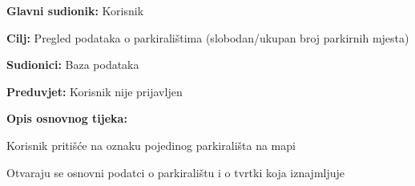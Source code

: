 \noindent {}
\begin{packed_item}
	
	\item \textbf{Glavni sudionik: } Korisnik
	\item  \textbf{Cilj:} Pregled podataka o parkiralištima (slobodan/ukupan broj parkirnih mjesta)
	\item  \textbf{Sudionici:} Baza podataka
	\item  \textbf{Preduvjet:} Korisnik nije prijavljen
	\item  \textbf{Opis osnovnog tijeka:}
	
	\item[] \begin{packed_enum}
		
		\item Korisnik pritišće na oznaku pojedinog parkirališta na mapi
		\item Otvaraju se osnovni podatci o parkiralištu i o tvrtki koja iznajmljuje

	\end{packed_enum}
\end{packed_item}

